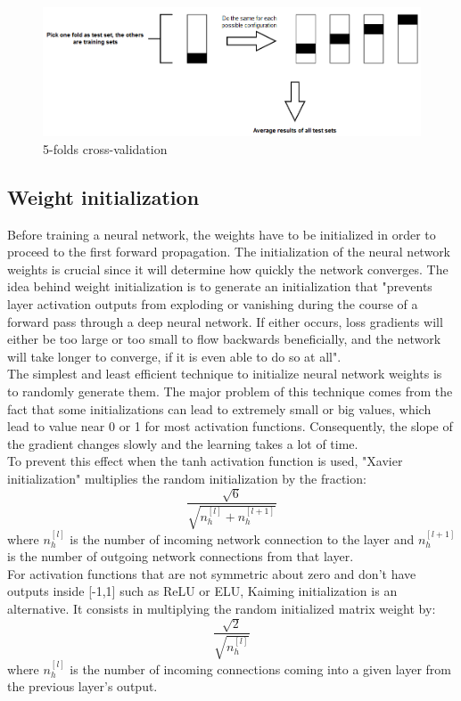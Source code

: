 \begin{figure}[!h]
\centering
\includegraphics[width=1\textwidth, keepaspectratio=true]{./figures/cross_validation.png}
\caption{5-folds cross-validation }
\label{cross_validation}
\end{figure}


\subsection{Weight initialization}
\label{weight_initialization}
Before training a neural network, the weights have to be initialized in order to proceed to the first forward propagation. The initialization of the neural network weights is crucial since it will determine how quickly the network converges. The idea behind weight initialization is to generate an initialization that "prevents layer activation outputs from exploding or vanishing during the course of a forward pass through a deep neural network. If either occurs, loss gradients will either be too large or too small to flow backwards beneficially, and the network will take longer to converge, if it is even able to do so at all"\cite{27}.\\
The simplest and least efficient technique to initialize neural network weights is to randomly generate them. The major problem of this technique comes from the fact that some initializations can lead to extremely small or big values, which lead to value near 0 or 1 for most activation functions. Consequently, the slope of the gradient changes slowly and the learning takes a lot of time.\\
To prevent this effect when the tanh activation function is used, "Xavier initialization" multiplies the random initialization by the fraction:
\begin{equation}
\frac{\sqrt{6}}{\sqrt{n_{h}^{[l]}+n_{h}^{[l+1]}}}
\end{equation}
where $n_{h}^{[l]}$ is the number of incoming network connection to the layer and $n_{h}^{[l+1]}$ is the number of outgoing network connections from that layer.\\
For activation functions that are not symmetric about zero and don't have outputs inside [-1,1] such as ReLU or ELU, Kaiming initialization is an alternative. It consists in multiplying the random initialized matrix weight by:
\begin{equation}
\frac{\sqrt{2}}{\sqrt{n_{h}^{[l]}}}
\end{equation} 
where $n_{h}^{[l]}$ is the number of incoming connections coming into a given layer from the previous layer's output.

